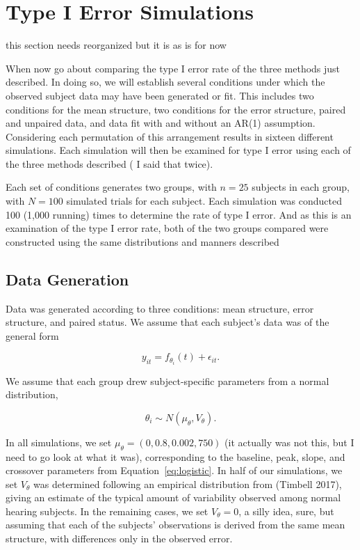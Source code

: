 \documentclass{article}
\begin{document}
\section{Type I Error Simulations}

this section needs reorganized but it is as is for now

When now go about comparing the type I error rate of the three methods just described. In doing so, we will establish several conditions under which the observed subject data may have been generated or fit. This includes two conditions for the mean structure, two conditions for the error structure, paired and unpaired data, and data fit with and without an AR(1) assumption. Considering each permutation of this arrangement results in sixteen different simulations. Each simulation will then be examined for type I error using each of the three methods described ( I said that twice). 

Each set of conditions generates two groups, with $n = 25$ subjects in each group, with $N = 100$ simulated trials for each subject. Each simulation was conducted 100 (1,000 running) times to determine the rate of type I error. And as this is an examination of the type I error rate, both of the two groups compared were constructed using the same distributions and manners described


\subsection{Data Generation}

Data was generated according to three conditions: mean structure, error structure, and paired status. We assume that each subject's data was of the general form 

\begin{equation}\label{eq:sm_f_general}
y_{it} = f_{\theta_i}(t) + \epsilon_{it}.
\end{equation}

We assume that each group drew subject-specific parameters from a normal distribution, 

\begin{equation}
\theta_i \sim N(\mu_{\theta}, V_{\theta}).
\end{equation}

In all simulations, we set $\mu_{\theta} = (0,0.8, 0.002, 750)$ (it actually was not this, but I need to go look at what it was), corresponding to the baseline, peak, slope, and crossover parameters from Equation~\ref{eq:logistic}. In half of our simulations, we set $V_{\theta}$ was determined following an empirical distribution from (Timbell 2017), giving an estimate of the typical amount of variability observed among normal hearing subjects. In the remaining cases, we set $V_{\theta} = 0$, a silly idea, sure, but assuming that each of the subjects' observations is derived from the same mean structure, with differences only in the observed error. 
\end{document}
